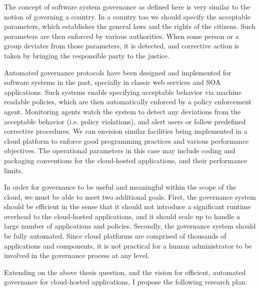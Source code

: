 The concept of software system governance as defined here is very similar to the
notion of governing a country. In a country too we should specify the acceptable
parameters, which establishes the general laws and the rights of the citizens. Such 
parameters are then
enforced by various authorities. When some person or a group deviates from those parameters,
it is detected, and corrective action is taken by bringing the responsible party to the justice.

Automated governance protocols have been designed and implemented for software systems in
the past, specially in classic web services and SOA applications. Such systems enable specifying
acceptable behavior via machine readable policies, which are then automatically enforced by
a policy enforcement agent. Monitoring agents watch the system to detect any deviations from
the acceptable behavior (i.e. policy violations), and alert users or follow predefined corrective
procedures. We can envision similar facilities being implemented in a cloud platform to 
enforce good programming practices and various performance objectives. The operational
parameters in this case may include coding and packaging conventions for the cloud-hosted
applications, and their performance limits.

In order for governance to be
useful and meaningful within the scope of the cloud, we must be able to meet two additional
goals. First, the governance system should be efficient in the sense that it should not introduce
a significant runtime overhead to the cloud-hosted applications, and it should scale up to
handle a large number of applications and policies. Secondly, the governance system should be
fully automated. Since cloud platforms are comprised of thousands of applications and components,
it is not practical for a human administrator to be involved in the governance process at any level.

Extending on the above thesis question, and the vision for efficient, automated governance for
cloud-hosted applications, I propose the following research plan:

